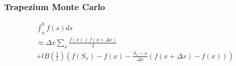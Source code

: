 \documentclass[20pt]{beamer}
\begin{document}



\begin{frame}
    \frametitle{Trapezium Monte Carlo}
    \fontsize{15}{17}\selectfont
    \begin{align}
         & \int_{a}^{b} f(s) ds                                      \\
         & \approx \Delta x \sum_{x}  \frac{f(x) + f(x+\Delta x)}{2} \\
         & + l B\left(\frac{1}{l}\right)
        \left(f(S_x) - f(x) - \frac{S_x - x}{\Delta x}(f(x+\Delta x) - f(x))\right)
    \end{align}
\end{frame}
\end{document}
